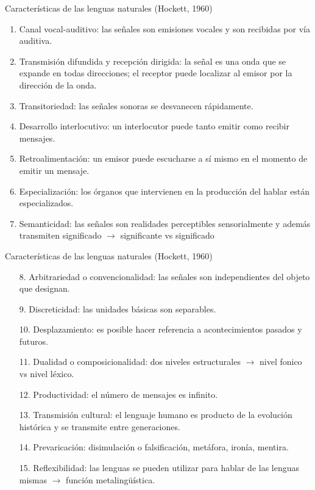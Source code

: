 \documentclass[handout]{beamer}
\begin{document}
\begin{frame}{Características de las lenguas naturales (Hockett, 1960)}

\begin{enumerate}
	\item Canal vocal-auditivo: las señales son emisiones vocales y son recibidas por vía auditiva.
	\item Transmisión difundida y recepción dirigida: la señal es una onda que se expande en todas direcciones; el receptor puede localizar al emisor por la dirección de la onda.
	\item Transitoriedad: las señales sonoras se desvanecen rápidamente.
	\item Desarrollo interlocutivo: un interlocutor puede tanto emitir como recibir mensajes.
	\item Retroalimentación: un emisor puede escucharse a sí mismo en el momento de emitir un mensaje.
	\item Especialización: los órganos que intervienen en la producción del hablar están especializados. 
	\item Semanticidad: las señales son realidades perceptibles sensorialmente y además transmiten significado $\rightarrow$ significante vs significado
\end{enumerate}

\end{frame}

\begin{frame}{Características de las lenguas naturales (Hockett, 1960)}

\begin{enumerate}
	\item[8.] Arbitrariedad o convencionalidad: las señales son independientes del objeto que designan.
	\item[9.] Discreticidad: las unidades básicas son separables. 
	\item[10.] Desplazamiento: es posible hacer referencia a acontecimientos pasados y futuros.
	\item[11.] Dualidad o composicionalidad: dos niveles estructurales $\rightarrow$ nivel fonico vs nivel léxico.
	\item[12.] Productividad: el número de mensajes es infinito.
	\item[13.] Transmisión cultural: el lenguaje humano es producto de la evolución histórica y se transmite entre generaciones.  
	\item[14.] Prevaricación: disimulación o falsificación, metáfora, ironía, mentira.
	\item[15.] Reflexibilidad: las lenguas se pueden utilizar para hablar de las lenguas mismas $\rightarrow$ función metalingüística.
\end{enumerate}

\end{frame}
\end{document}
